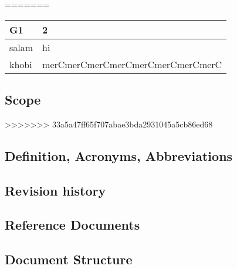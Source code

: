 =======
\begin{table}[hbt!]
\begin{tabular}{ l | l}
\hline
    \textbf{G1} & 2 \\  \hline
    \rowcolor[HTML]{34CDF9} salam & hi \\
    khobi & merCmerCmerCmerCmerCmerCmerCmerC \\ \hline
\end{tabular}
\end{table}

\subsection{Scope}
>>>>>>> 33a5a47ff65f707abae3bda2931045a5cb86ed68
\subsection{Definition, Acronyms, Abbreviations}
\subsection{Revision history}
\subsection{Reference Documents}
\subsection{Document Structure}
\vfill
